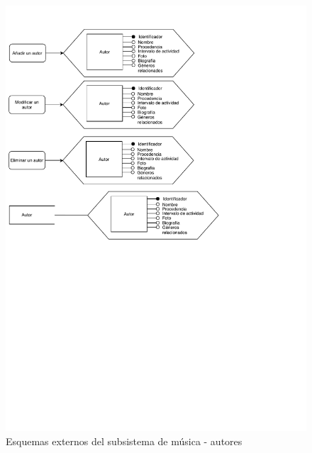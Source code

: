 \begin{figure}[H]
  \caption{Esquemas externos del subsistema de música - autores}
  \centering
  \includegraphics{diagramas/musica-externo-autor.pdf}
\end{figure}

